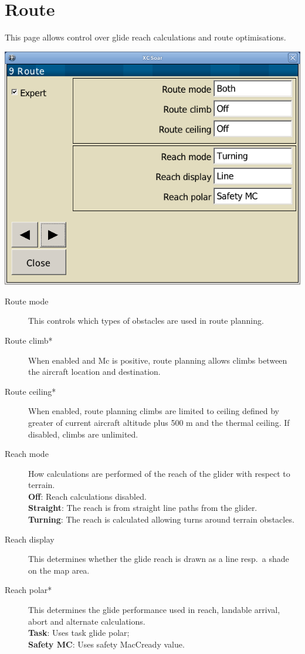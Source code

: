 \clearpage
\section{Route}

This page allows control over glide reach calculations and route
optimisations.

\begin{center}
\includegraphics[angle=0,width=0.8\linewidth,keepaspectratio='true']{figures/config-route.png}
\end{center}

\begin{description}
\item[Route mode]  \label{conf:routemode} This controls which types
  of obstacles are used in route planning.
\item[Route climb*]  \label{conf:routeclimb} When enabled and Mc is positive, route 
  planning allows climbs between the aircraft location and destination.
\item[Route ceiling*]  \label{conf:routeceiling} When enabled, route planning climbs 
  are limited to ceiling defined by greater of current aircraft altitude plus 
  500 m and the thermal ceiling.  If disabled, climbs are unlimited.
\\
\item[Reach mode]  \label{conf:turningreach} How calculations are performed of 
  the reach of the glider with respect to terrain. \\
  {\bf Off}: Reach calculations disabled. \\
  {\bf Straight}: The reach is from straight line paths from the glider. \\
  {\bf Turning}: The reach is calculated allowing turns around terrain obstacles.
\item[Reach display]  \label{conf:gliderange} This determines whether the
glide reach is drawn as a line resp.\ a shade on the map area.
\item[Reach polar*]  \label{conf:reachpolar} This determines the glide performance 
  used in reach, landable arrival, abort and alternate calculations. \\
  {\bf Task}: Uses task glide polar; \\
  {\bf Safety MC}: Uses safety MacCready value.
\end{description}


